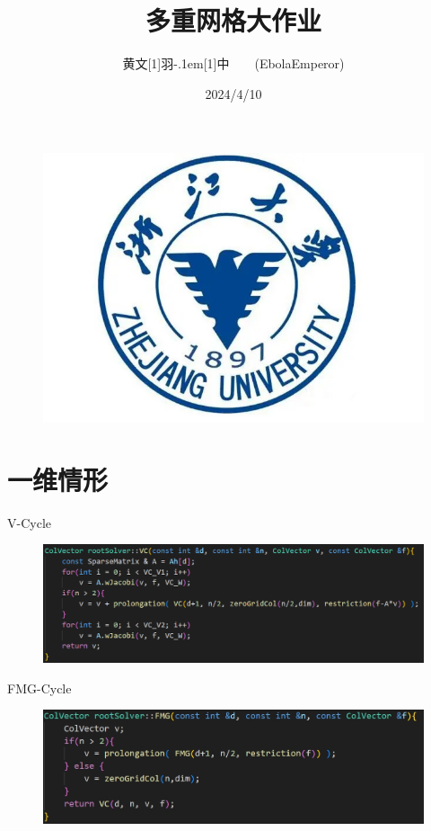 \documentclass[9pt]{beamer}
\title{多重网格大作业}
\institute{浙江大学\ \ \ \ 数学科学学院}
\date{2024/4/10}
\begin{document}
\author{黄文\hbox{\scalebox{0.6}[1]{羽}\kern-.1em\scalebox{0.5}[1]{中}}\ \ \ \ (EbolaEmperor)}

\kaishu
\begin{frame}
    \titlepage
    \begin{figure}[htpb]
        \begin{center}
            \vspace*{-0.5cm}
            \includegraphics[width=0.2\linewidth]{pic/zju.jpg}
        \end{center}
    \end{figure}
\end{frame}

\begin{frame}
    \tableofcontents[sectionstyle=show,subsectionstyle=show/shaded/hide,subsubsectionstyle=show/shaded/hide]
\end{frame}


\section{一维情形}

\begin{frame}{V-Cycle}

\begin{figure}[H]
  \centering
  \includegraphics[width=\textwidth]{pic/v.png}
\end{figure}

\end{frame}

\begin{frame}{FMG-Cycle}

\begin{figure}[H]
  \centering
  \includegraphics[width=\textwidth]{pic/FMG.png}
\end{figure}

\end{frame}
\end{document}
